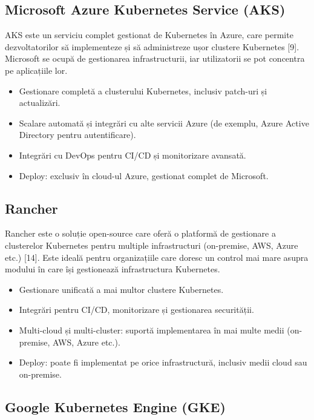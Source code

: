 \documentclass[12pt,a4paper]{report}
\begin{document}
\subsection{Microsoft Azure Kubernetes Service (AKS)}

AKS este un serviciu complet gestionat de Kubernetes în Azure, care permite dezvoltatorilor să implementeze și să administreze ușor clustere Kubernetes [9]. Microsoft se ocupă de gestionarea infrastructurii, iar utilizatorii se pot concentra pe aplicațiile lor.

\begin{itemize}
  \item Gestionare completă a clusterului Kubernetes, inclusiv patch-uri și actualizări.
  \item Scalare automată și integrări cu alte servicii Azure (de exemplu, Azure Active Directory pentru autentificare).
  \item Integrări cu DevOps pentru CI/CD și monitorizare avansată.
  \item Deploy: exclusiv în cloud-ul Azure, gestionat complet de Microsoft.
\end{itemize}

\subsection{Rancher}

Rancher este o soluție open-source care oferă o platformă de gestionare a clusterelor Kubernetes pentru multiple infrastructuri (on-premise, AWS, Azure etc.) [14]. Este ideală pentru organizațiile care doresc un control mai mare asupra modului în care își gestionează infrastructura Kubernetes.

\begin{itemize}
  \item Gestionare unificată a mai multor clustere Kubernetes.
  \item Integrări pentru CI/CD, monitorizare și gestionarea securității.
  \item Multi-cloud și multi-cluster: suportă implementarea în mai multe medii (on-premise, AWS, Azure etc.).
  \item Deploy: poate fi implementat pe orice infrastructură, inclusiv medii cloud sau on-premise.
\end{itemize}

\subsection{Google Kubernetes Engine (GKE)}
\end{document}
